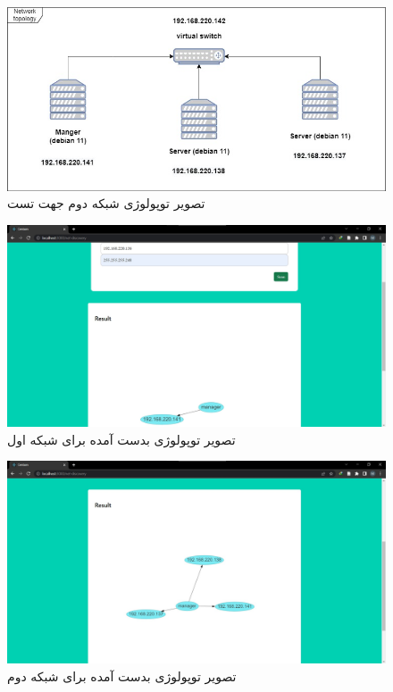\begin{figure}[!h]
    \centering\includegraphics[scale=.38]{./topo-test2}
    \caption{تصویر توپولوژی شبکه دوم جهت تست}\label{fig.52}
\end{figure}




\begin{figure}[!h]
    \centering\includegraphics[scale=.38]{./topo-test1-result}
    \caption{تصویر توپولوژی بدست آمده برای شبکه اول}\label{fig.511}
\end{figure}


\begin{figure}[!h]
    \centering\includegraphics[scale=.38]{./topo-test2-result}
    \caption{تصویر توپولوژی بدست آمده برای شبکه دوم}\label{fig.521}
\end{figure}





